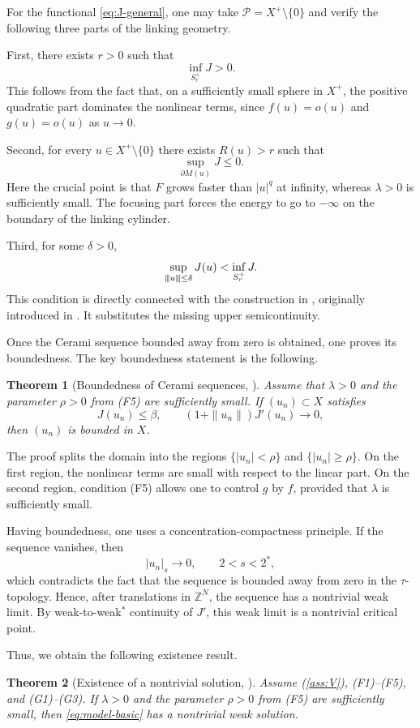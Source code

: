 \documentclass[11pt]{amsart}
\numberwithin{equation}{section}
\newtheorem{theorem}{Theorem}[section]
\theoremstyle{definition}
\newcommand{\Z}{\mathbb{Z}}
\newcommand{\cP}{\mathcal{P}}
\newcommand{\vertiii}[1]{{\left\vert\kern-0.25ex\left\vert\kern-0.25ex\left\vert #1 \right\vert\kern-0.25ex\right\vert\kern-0.25ex\right\vert}}
\begin{document}
For the functional \eqref{eq:J-general}, one may take
$\cP=X^+\setminus\{0\}$ and verify the following three parts of the
linking geometry.

First, there exists $r>0$ such that
\[
\inf_{S_r^+}J>0.
\]
This follows from the fact that, on a sufficiently small sphere in $X^+$,
the positive quadratic part dominates the nonlinear terms, since
$f(u)=o(u)$ and $g(u)=o(u)$ as $u\to0$.

Second, for every $u\in X^+\setminus\{0\}$ there exists $R(u)>r$ such
that
\[
\sup_{\partial M(u)}J\le0.
\]
Here the crucial point is that $F$ grows faster than $|u|^q$ at infinity,
whereas $\lambda>0$ is sufficiently small. The focusing part forces the
energy to go to $-\infty$ on the boundary of the linking cylinder.

Third, for some $\delta>0$,
\[
\sup_{\vertiii{u}\le\delta}J(u)<\inf_{S_r^+}J.
\]
This condition is directly connected with the construction in
\cite{BB2022}, originally introduced in \cite{ChenWang}. It substitutes the missing upper semicontinuity.

Once the Cerami sequence bounded away from zero is obtained, one proves
its boundedness. The key boundedness statement is the following.

\begin{theorem}[Boundedness of Cerami sequences, {\cite[Proposition 5.2]{BB2022}}]
Assume that $\lambda>0$ and the parameter $\rho>0$ from (F5) are
sufficiently small. If $(u_n)\subset X$ satisfies
\[
J(u_n)\le\beta,\qquad
(1+\|u_n\|)J'(u_n)\to0,
\]
then $(u_n)$ is bounded in $X$.
\end{theorem}

The proof splits the domain into the regions $\{|u_n|<\rho\}$ and
$\{|u_n|\ge\rho\}$. On the first region, the nonlinear terms are small
with respect to the linear part. On the second region, condition (F5)
allows one to control $g$ by $f$, provided that $\lambda$ is sufficiently
small.

Having boundedness, one uses a concentration-compactness principle. If the sequence vanishes, then
\[
|u_n|_s\to0,\qquad 2<s<2^*,
\]
which contradicts the fact that the sequence is bounded away from zero in
the $\tau$-topology. Hence, after translations in $\Z^{N}$, the sequence
has a nontrivial weak limit. By weak-to-weak$^*$ continuity of $J'$, this
weak limit is a nontrivial critical point.

Thus, we obtain the following existence result.

\begin{theorem}[Existence of a nontrivial solution, {\cite[Theorem 1.2]{BB2022}}]\label{thm:BB-existence}
Assume (\ref{ass:V}), (F1)--(F5), and (G1)--(G3). If $\lambda>0$ and the
parameter $\rho>0$ from (F5) are sufficiently small, then
\eqref{eq:model-basic} has a nontrivial weak solution.
\end{theorem}
\end{document}
